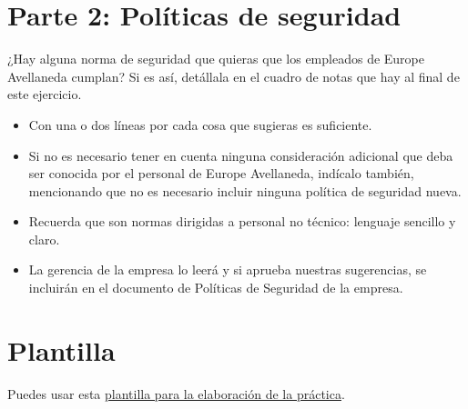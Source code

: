 \documentclass[a4paper]{article}
\begin{document}
\section{Parte 2: Políticas de seguridad}
\label{sec:org0000006}
¿Hay alguna norma de seguridad que quieras que los empleados de Europe Avellaneda cumplan? Si es así, detállala en el cuadro de notas que hay al final de este ejercicio.
\begin{itemize}
\item Con una o dos líneas por cada cosa que sugieras es suficiente.
\item Si no es necesario tener en cuenta ninguna consideración adicional que deba ser conocida por el personal de Europe Avellaneda, indícalo también, mencionando que no es necesario incluir ninguna política de seguridad nueva.
\item Recuerda que son normas dirigidas a personal no técnico: lenguaje sencillo y claro.
\item La gerencia de la empresa lo leerá y si aprueba nuestras sugerencias, se incluirán en el documento de Políticas de Seguridad de la empresa.
\end{itemize}
\section{Plantilla}
\label{sec:org0000009}
Puedes usar esta \href{sad-01-plantilla-analisis-riesgos.docx}{plantilla para la elaboración de la práctica}.
\end{document}
